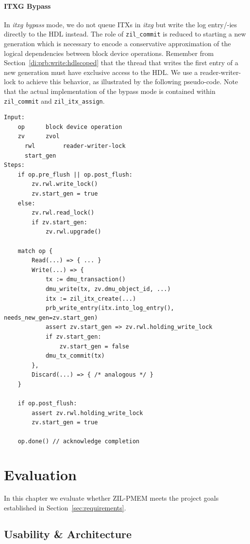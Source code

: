 \documentclass[12pt,a4paper,twoside]{book}
\begin{document}
\subsubsection{ITXG Bypass}

In \textit{itxg bypass} mode, we do not queue ITXs in \textit{itxg} but write the log entry/-ies directly to the HDL instead.
The role of \lstinline{zil_commit} is reduced to starting a new generation which is necessary to encode a conservative approximation of the logical dependencies between block device operations.
Remember from Section~\ref{di:prb:write:hdlscoped} that the thread that writes the first entry of a new generation must have exclusive access to the HDL.
We use a reader-writer-lock to achieve this behavior, as illustrated by the following pseudo-code.
Note that the actual implementation of the bypass mode is contained within \lstinline{zil_commit} and \lstinline{zil_itx_assign}.

\begin{lstlisting}[style=figurepseudocode]
Input:
    op      block device operation
    zv      zvol
      rwl        reader-writer-lock
      start_gen
Steps:
    if op.pre_flush || op.post_flush:
        zv.rwl.write_lock()
        zv.start_gen = true
    else:
        zv.rwl.read_lock()
        if zv.start_gen:
            zv.rwl.upgrade()

    match op {
        Read(...) => { ... }
        Write(...) => {
            tx := dmu_transaction()
            dmu_write(tx, zv.dmu_object_id, ...)
            itx := zil_itx_create(...)
            prb_write_entry(itx.into_log_entry(), needs_new_gen=zv.start_gen)
            assert zv.start_gen => zv.rwl.holding_write_lock
            if zv.start_gen:
                zv.start_gen = false
            dmu_tx_commit(tx)
        },
        Discard(...) => { /* analogous */ }
    }

    if op.post_flush:
        assert zv.rwl.holding_write_lock
        zv.start_gen = true

    op.done() // acknowledge completion
\end{lstlisting}

\chapter{Evaluation}\label{ch:eval}
In this chapter we evaluate whether ZIL-PMEM meets the project goals established in Section~\ref{sec:requirements}.

\section{Usability \& Architecture}
\end{document}

